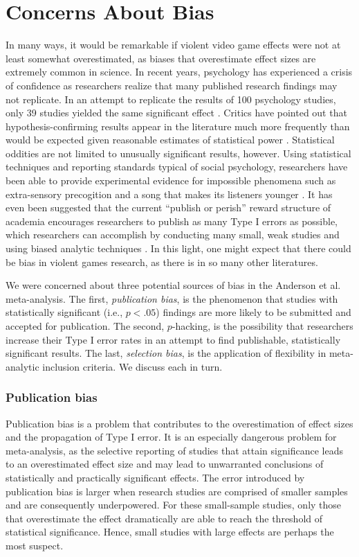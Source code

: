 \documentclass[man]{apa6}
\begin{document}
\section{Concerns About Bias}
In many ways, it would be remarkable if violent video game effects were not at least somewhat overestimated, as biases that overestimate effect sizes are extremely common in science.
In recent years, psychology has experienced a crisis of confidence as researchers realize that many published research findings may not replicate. In an attempt to replicate the results of 100 psychology studies, only 39 studies yielded the same significant effect \citep{OpenScienceCollaboration:2015}. Critics have pointed out that hypothesis-confirming results appear in the literature much more frequently than would be expected given reasonable estimates of statistical power \citep[see][]{Schimmack:2012}. Statistical oddities are not limited to unusually significant results, however. Using statistical techniques and reporting standards typical of social psychology, researchers have been able to provide experimental evidence for impossible phenomena such as extra-sensory precogition \citep{Bem:2011} and a song that makes its listeners younger \citep{Simmons:etal:2011}. 
It has even been suggested that the current ``publish or perish'' reward structure of academia encourages researchers to publish as many Type I errors as possible, which researchers can accomplish by conducting many small, weak studies and using biased analytic techniques \citep{Bakker:etal:2012}. In this light, one might expect that there could be bias in violent games research, as there is in so many other literatures. 

We were concerned about three potential sources of bias in the Anderson et al. meta-analysis. The first, {\em publication bias}, is the phenomenon that studies with statistically significant (i.e., $p<.05$) findings are more likely to be submitted and accepted for publication. The second, $p$-hacking, is the possibility that researchers increase their Type I error rates in an attempt to find publishable, statistically significant results. The last, {\em selection bias}, is the application of flexibility in meta-analytic inclusion criteria. We discuss each in turn.

\subsubsection{Publication bias}
Publication bias is a problem that contributes to the overestimation of effect sizes and the propagation of Type I error. It is an especially dangerous problem for meta-analysis, as the selective reporting of studies that attain significance leads to an overestimated effect size and may lead to unwarranted conclusions of statistically and practically significant effects. The error introduced by publication bias is larger when research studies are comprised of smaller samples and are consequently underpowered.  For these small-sample studies, only those that overestimate the effect dramatically are able to reach the threshold of statistical significance. Hence, small studies with large effects are perhaps the most suspect.  
\end{document}

